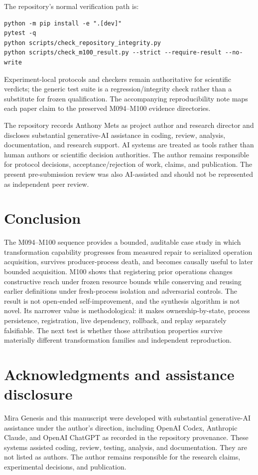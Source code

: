 \documentclass[10pt]{article}
\begin{document}
The repository's normal verification path is:
\begin{Verbatim}[fontsize=\small]
python -m pip install -e ".[dev]"
pytest -q
python scripts/check_repository_integrity.py
python scripts/check_m100_result.py --strict --require-result --no-write
\end{Verbatim}
Experiment-local protocols and checkers remain authoritative for scientific verdicts; the generic test suite is a regression/integrity check rather than a substitute for frozen qualification. The accompanying reproducibility note maps each paper claim to the preserved M094--M100 evidence directories.

The repository records Anthony Mets as project author and research director and discloses substantial generative-AI assistance in coding, review, analysis, documentation, and research support. AI systems are treated as tools rather than human authors or scientific decision authorities. The author remains responsible for protocol decisions, acceptance/rejection of work, claims, and publication. The present pre-submission review was also AI-assisted and should not be represented as independent peer review.

\section{Conclusion}
The M094--M100 sequence provides a bounded, auditable case study in which transformation capability progresses from measured repair to serialized operation acquisition, survives producer-process death, and becomes causally useful to later bounded acquisition. M100 shows that registering prior operations changes constructive reach under frozen resource bounds while conserving and reusing earlier definitions under fresh-process isolation and adversarial controls. The result is not open-ended self-improvement, and the synthesis algorithm is not novel. Its narrower value is methodological: it makes ownership-by-state, process persistence, registration, live dependency, rollback, and replay separately falsifiable. The next test is whether those attribution properties survive materially different transformation families and independent reproduction.

\section*{Acknowledgments and assistance disclosure}
Mira Genesis and this manuscript were developed with substantial generative-AI assistance under the author's direction, including OpenAI Codex, Anthropic Claude, and OpenAI ChatGPT as recorded in the repository provenance. These systems assisted coding, review, testing, analysis, and documentation. They are not listed as authors. The author remains responsible for the research claims, experimental decisions, and publication.
\end{document}
